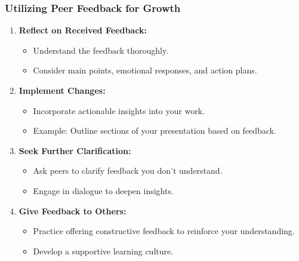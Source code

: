 \documentclass[aspectratio=169]{beamer}
\begin{document}
\begin{frame}[fragile]
    \frametitle{Utilizing Peer Feedback for Growth}
    \begin{enumerate}
        \item \textbf{Reflect on Received Feedback:}
        \begin{itemize}
            \item Understand the feedback thoroughly.
            \item Consider main points, emotional responses, and action plans.
        \end{itemize}
    
        \item \textbf{Implement Changes:}
        \begin{itemize}
            \item Incorporate actionable insights into your work.
            \item Example: Outline sections of your presentation based on feedback.
        \end{itemize}

        \item \textbf{Seek Further Clarification:}
        \begin{itemize}
            \item Ask peers to clarify feedback you don’t understand.
            \item Engage in dialogue to deepen insights.
        \end{itemize}
    
        \item \textbf{Give Feedback to Others:}
        \begin{itemize}
            \item Practice offering constructive feedback to reinforce your understanding.
            \item Develop a supportive learning culture.
        \end{itemize}
    \end{enumerate}
\end{frame}
\end{document}
